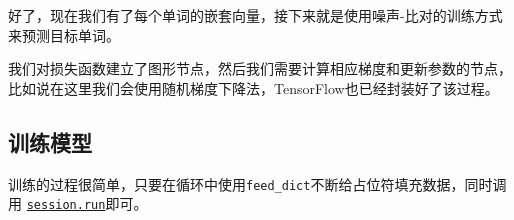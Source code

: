 \begin{Shaded}
\begin{Highlighting}[]
\OperatorTok{=} 
\end{Highlighting}
\end{Shaded}

好了，现在我们有了每个单词的嵌套向量，接下来就是使用噪声-比对的训练方式来预测目标单词。

\begin{Shaded}
\begin{Highlighting}[]
\OperatorTok{=} 
\end{Highlighting}
\end{Shaded}

我们对损失函数建立了图形节点，然后我们需要计算相应梯度和更新参数的节点，比如说在这里我们会使用随机梯度下降法，TensorFlow也已经封装好了该过程。

\begin{Shaded}
\begin{Highlighting}[]
\OperatorTok{=} \OperatorTok{=}
\end{Highlighting}
\end{Shaded}

\subsection{训练模型 }\label{ux8badux7ec3ux6a21ux578b}

训练的过程很简单，只要在循环中使用\texttt{feed\_dict}不断给占位符填充数据，同时调用
\href{tensorflow-zh/SOURCE/api_docs/python/client.md\#Session.run}{\texttt{session.run}}即可。

\begin{Shaded}
\begin{Highlighting}[]
  
  \OperatorTok{=} 
  \OperatorTok{=} \OperatorTok{=}
\end{Highlighting}
\end{Shaded}

